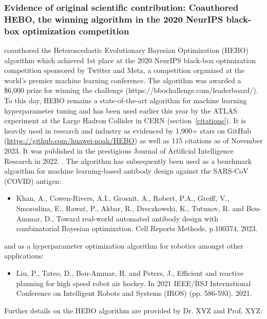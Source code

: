 \documentclass[11pt]{article}
\begin{document}
\subsubsection{Evidence of original scientific contribution: Coauthored HEBO, the winning algorithm in the 2020 NeurIPS black-box optimization competition}
\label{hebo}

\dr coauthored the Heteroscedastic Evolutionary Bayesian Optimization (HEBO) algorithm which achieved 1st place at the 2020 NeurIPS black-box optimization competition sponsored by Twitter and Meta, a competition organized at the world's premier machine learning conference. The algorithm was awarded a \$6,000 prize for winning the challenge (https://bbochallenge.com/leaderboard/). To this day, HEBO remains a state-of-the-art algorithm for machine learning hyperparameter tuning and has been used earlier this year by the ATLAS experiment at the Large Hadron Collider in CERN (section~\ref{citations}). It is heavily used in research and industry as evidenced by 1,900+ stars on GitHub (\url{https://github.com/huawei-noah/HEBO}) as well as 115 citations as of November 2023. It was published in the prestigious Journal of Artificial Intelligence Research in 2022. \cite{hebo}. The algorithm has subsequently been used as a benchmark algorithm for machine learning-based antibody design against the SARS-CoV (COVID) antigen:

\begin{itemize}
    \item Khan, A., Cowen-Rivers, A.I., Grosnit, A., Robert, P.A., Greiff, V., Smorodina, E., Rawat, P., Akbar, R., Dreczkowski, K., Tutunov, R. and Bou-Ammar, D., Toward real-world automated antibody design with combinatorial Bayesian optimization. Cell Reports Methods, p.100374, 2023.
\end{itemize}

and as a hyperparameter optimization algorithm for robotics amongst other applications:

\begin{itemize}
    \item Liu, P., Tateo, D., Bou-Ammar, H. and Peters, J., Efficient and reactive planning for high speed robot air hockey. In 2021 IEEE/RSJ International Conference on Intelligent Robots and Systems (IROS) (pp. 586-593). 2021.
\end{itemize}

Further details on the HEBO algorithm are provided by Dr. XYZ and Prof. XYZ:\\\\
\end{document}
